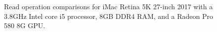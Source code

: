 \begin{figure}[!htb]
\centering
{}


\caption{Read operation comparisons for iMac Retina 5K 27-inch 2017 with a 3.8GHz Intel core i5 processor, 8GB DDR4 RAM, and a Radeon Pro 580 8G GPU.
\label{fig:perf-imac-read}}
\end{figure}


